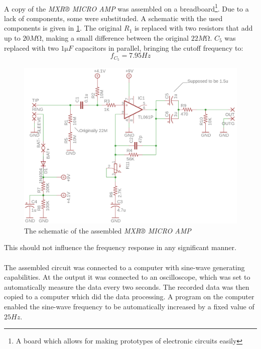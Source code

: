 \documentclass[a4paper, 12pt]{article}
\begin{document}
\paragraph*{}
A copy of the \textit{MXR® MICRO AMP} was assembled on a 
breadboard\footnote{A board which allows for making prototypes of electronic 
circuits easily}. Due to a lack of components, some were substituded. A 
schematic with the used components is given in \ref{fig:mxr-microamp-used}. 
The original $R_1$ is replaced with two resistors that add up to 
$20\si{M\ohm}$, making a small difference between the original $22\si{M\ohm}$. 
$C_5$ was replaced with two $1\si{\micro F}$ capacitors in parallel, bringing 
the cutoff frequency to:
$$f_{C_5} = 7.95 \si{Hz}$$
\begin{figure}[ht]
	\centering
	\includegraphics{img/mxr-microamp-used}
	\caption{The schematic of the assembled \textit{MXR® MICRO AMP}}
	\label{fig:mxr-microamp-used}
\end{figure}
This should not influence the frequency response in any significant manner.

\paragraph*{}
The assembled circuit was connected to a computer with sine-wave generating 
capabilities. At the output it was connected to an oscilloscope, which was set 
to automatically measure the data every two seconds. The recorded data was 
then copied to a computer which did the data processing. A program on the 
computer enabled the sine-wave frequency to be automatically increased by a 
fixed value of $25Hz$.
\end{document}
